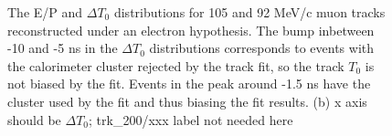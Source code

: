 \begin{figure}[H]
\hspace{-0.6in}
  \caption{
  \label{fig:pid_ep_dt}
    {\blue The} E/P and  {\blue $\Delta{T_0}$} distributions for 105 and 92 MeV/c muon tracks
    reconstructed under {\blue an} electron hypothesis. {\blue The b}ump  {\blue inbetween}
    -10 and -5 ns in the  {\blue $\Delta{T_0}$} distributions corresponds to events 
    with the calorimeter cluster rejected by the track fit, so the track $T_0$ is not biased by the fit.
    Events in the peak around -1.5 ns have the  {\blue cluster used by} 
    the fit and thus biasing the fit results.
    {\blue (b) x axis should be $\Delta{T_0}$;}
    {\blue trk\_200/xxx label not needed here}
  }
\end{figure}

